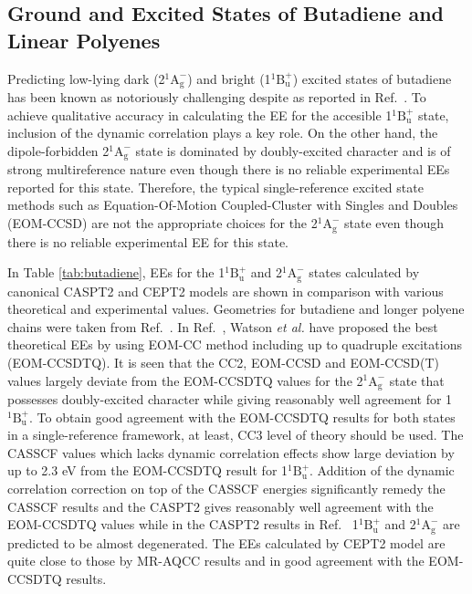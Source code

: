 \documentclass[aip,jcp,amsmath]{revtex4-1}
\begin{document}
\subsection{Ground and Excited States of Butadiene and Linear Polyenes}

%
Predicting low-lying dark (2${}^1\text{A}_\text{g}^{-}$) and bright (1${}^1\text{B}_\text{u}^{+}$) excited states of butadiene has been known as notoriously challenging despite as reported in Ref.~.
%
To achieve qualitative accuracy in calculating the EE for the accesible 1${}^1\text{B}_\text{u}^{+}$ state, inclusion of the dynamic correlation plays a key role.
%
On the other hand, the dipole-forbidden 2${}^1\text{A}_\text{g}^{-}$ state is dominated by doubly-excited character and is of strong multireference nature even though there is no reliable experimental EEs reported for this state.
%
Therefore, the typical single-reference excited state methods such as Equation-Of-Motion Coupled-Cluster with Singles and Doubles (EOM-CCSD) are not the appropriate choices for the 2${}^1\text{A}_\text{g}^{-}$ state even though there is no reliable experimental EE for this state.

%
In Table \ref{tab:butadiene}, EEs for the 1${}^1\text{B}_\text{u}^{+}$ and 2${}^1\text{A}_\text{g}^{-}$ states calculated by canonical CASPT2 and CEPT2 models are shown in comparison with various theoretical and experimental values.
%
Geometries for butadiene and longer polyene chains were taken from Ref.~.
%
In Ref.~, Watson {\it et al.} have proposed the best theoretical EEs by using EOM-CC method including up to quadruple excitations (EOM-CCSDTQ).
%
It is seen that the CC2, EOM-CCSD and EOM-CCSD(T) values largely deviate from the EOM-CCSDTQ values for the 2${}^1\text{A}_\text{g}^{-}$ state that possesses doubly-excited character while giving reasonably well agreement for 1${}^1\text{B}_\text{u}^{+}$.
%
To obtain good agreement with the EOM-CCSDTQ results for both states in a single-reference framework, at least, CC3 level of theory should be used.
%
The CASSCF values which lacks dynamic correlation effects show large deviation by up to 2.3 eV from the EOM-CCSDTQ result for 1${}^1\text{B}_\text{u}^{+}$.
%
Addition of the dynamic correlation correction on top of the CASSCF energies significantly remedy the CASSCF results and the CASPT2 gives reasonably well agreement with the EOM-CCSDTQ values while in the CASPT2 results in Ref.~ 1${}^1\text{B}_\text{u}^{+}$ and 2${}^1\text{A}_\text{g}^{-}$ are predicted to be almost degenerated.
%
The EEs calculated by CEPT2 model are quite close to those by MR-AQCC results and in good agreement with the EOM-CCSDTQ results.
\end{document}
